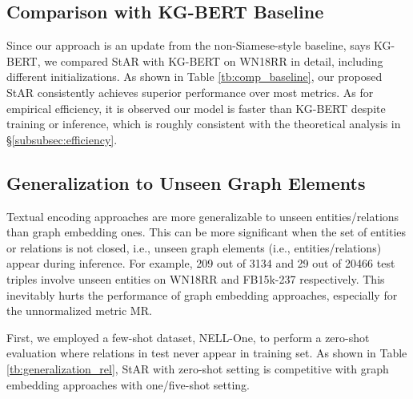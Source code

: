 \documentclass[sigconf]{acmart}
\begin{document}
\subsection{Comparison with KG-BERT Baseline} \label{subsec:comp_baseline}

Since our approach is an update from the non-Siamese-style baseline, says KG-BERT, we compared StAR with KG-BERT on WN18RR in detail, including different initializations. As shown in Table \ref{tb:comp_baseline}, our proposed StAR consistently achieves superior performance over most metrics. 
As for empirical efficiency, it is observed our model is faster than KG-BERT despite training or inference, which is roughly consistent with the theoretical analysis in \S\ref{subsubsec:efficiency}. 



\subsection{Generalization to Unseen Graph Elements} \label{subsec:exp_generalization}

Textual encoding approaches are more generalizable to unseen entities/relations than graph embedding ones. 
This can be more significant when the set of entities or relations is not closed, i.e., unseen graph elements (i.e., entities/relations) appear during inference. For example, 209 out of 3134 and 29 out of 20466 test triples involve unseen entities on WN18RR and FB15k-237 respectively. This inevitably hurts the performance of graph embedding approaches, especially for the unnormalized metric MR. 



First, we employed a few-shot dataset, NELL-One, to perform a zero-shot evaluation where relations in test never appear in training set. As shown in Table \ref{tb:generalization_rel}, StAR with zero-shot setting is competitive with graph embedding approaches with one/five-shot setting. 
\end{document}
